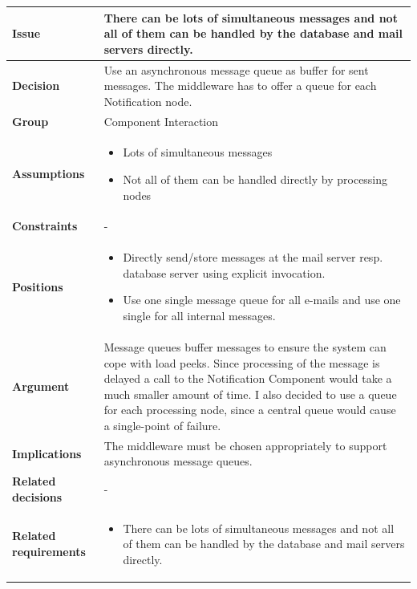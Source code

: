 \documentclass[11pt]{article}
\begin{document}
\begin{table}[h] \small
	\begin{tabularx}{\textwidth}{ | l | X |}
    	\hline
	\cellcolor[gray]{0.9}
    	\textbf{Issue} & There can be lots of simultaneous messages and not all of them can be handled by the database and mail servers directly. \\
	\hline
	\cellcolor[gray]{0.9}
	\textbf{Decision} & Use an asynchronous message queue as buffer for sent messages. The middleware has to offer a queue for each Notification node. \\
	\hline
	\cellcolor[gray]{0.9}
	\textbf{Group} & Component Interaction \\
	\hline
	\cellcolor[gray]{0.9}
	\textbf{Assumptions} &
		\begin{itemize}
		\item Lots of simultaneous messages
		\item Not all of them can be handled directly by processing nodes
		\end{itemize} \\
	\hline
	\cellcolor[gray]{0.9}
	\textbf{Constraints} & - \\
	\hline
	\cellcolor[gray]{0.9}
	\textbf{Positions} &
		\begin{itemize}
		\item Directly send/store messages at the mail server resp. database server using explicit invocation.
		\item Use one single message queue for all e-mails and use one single for all internal messages.
		\end{itemize} \\
	\hline
	\cellcolor[gray]{0.9}
	\textbf{Argument} & Message queues buffer messages to ensure the system can cope with load peeks. Since processing of the message is delayed a call to the Notification Component would take a much smaller amount of time. I also decided to use a queue for each processing node, since a central queue would cause a single-point of failure. \\
	\hline
	\cellcolor[gray]{0.9}
	\textbf{Implications} & The middleware must be chosen appropriately to support asynchronous message queues. \\
	\hline
	\cellcolor[gray]{0.9}
	\textbf{Related decisions} & - \\
	\hline
	\cellcolor[gray]{0.9}
	\textbf{Related requirements} &
		\begin{itemize}
		\item There can be lots of simultaneous messages and not all of them can be handled by the database and mail servers directly.

\end{itemize}
\end{tabularx}
\end{table}
\end{document}
